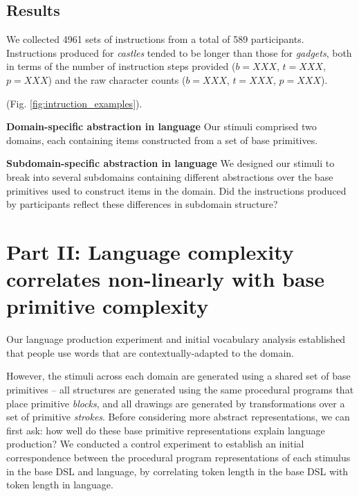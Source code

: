 \documentclass[10pt,letterpaper]{article}
\begin{document}




\subsection{Results}

We collected 4961 sets of instructions from a total of 589 participants. %
Instructions produced for \textit{castles} tended to be longer than those for \textit{gadgets}, both in terms of the number of instruction steps provided ($b=XXX$, $t=XXX$, $p=XXX$) and the raw character counts ($b=XXX$, $t=XXX$, $p=XXX$).



(Fig. \ref{fig:intruction_examples}).

\par \textbf{Domain-specific abstraction in language}
Our stimuli comprised two domains, each containing items constructed from a set of base primitives.



\par \textbf{Subdomain-specific abstraction in language}
We designed our stimuli to break into several subdomains containing different abstractions over the base primitives used to construct items in the domain.
Did the instructions produced by participants reflect these differences in subdomain structure?


\section{Part II: Language complexity correlates non-linearly with base primitive complexity} \label{sec-part-ii}

Our language production experiment and initial vocabulary analysis established that people use words that are contextually-adapted to the domain.

However, the stimuli across each domain are generated using a shared set of base primitives -- all structures are generated using the same procedural programs that place primitive \textit{blocks}, and all drawings are generated by transformations over a set of primitive \textit{strokes}. Before considering more abstract representations, we can first ask: how well do these base primitive representations explain language production? We conducted a control experiment to establish an initial correspondence between the procedural program representations of each stimulus in the base DSL and language, by correlating token length in the base DSL with token length in language.
\end{document}
